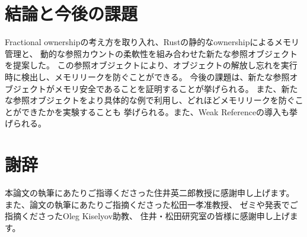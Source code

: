 \documentclass{sumiilab-paper}
\theoremstyle{mystyle}
\numberwithin{definition}{chapter} %
\begin{document}
\chapter{結論と今後の課題}
Fractional ownershipの考え方を取り入れ、Rustの静的なownershipによるメモリ管理と、
動的な参照カウントの柔軟性を組み合わせた新たな参照オブジェクトを提案した。
この参照オブジェクトにより、オブジェクトの解放し忘れを実行時に検出し、メモリリークを防ぐことができる。
今後の課題は、新たな参照オブジェクトがメモリ安全であることを証明することが挙げられる。
また、新たな参照オブジェクトをより具体的な例で利用し、どれほどメモリリークを防ぐことができたかを実験することも
挙げられる。また、Weak Referenceの導入も挙げられる。

\backmatter%
\chapter{謝辞}
本論文の執筆にあたりご指導くださった住井英二郎教授に感謝申し上げます。
また、論文の執筆にあたりご指摘くださった松田一孝准教授、
ゼミや発表でご指摘くださったOleg Kiselyov助教、
住井・松田研究室の皆様に感謝申し上げます。


\end{document}
